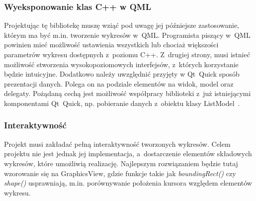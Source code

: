 \documentclass[11pt,twoside,a4paper,final]{article}
\begin{document}
\subsubsection{Wyeksponowanie klas C++ w QML}
Projektując tę bibliotekę muszę wziąć pod uwagę jej późniejsze zastosowanie, którym ma być m.in. tworzenie wykresów w~QML. Programista piszący w~QML powinien mieć możliwość ustawienia wszystkich lub chociaż większości parametrów wykresu dostępnych z~poziomu C++. Z~drugiej strony, musi istnieć możliwość stworzenia wysokopoziomowych interfejsów, z~których korzystanie będzie intuicyjne. Dodatkowo należy uwzględnić przyjęty w Qt~Quick sposób prezentacji danych. Polega on na podziale elementów na widok, model oraz delegaty. Pożądaną cechą jest możliwość współpracy biblioteki z~już istniejącymi komponentami Qt~Quick, np. pobieranie danych z~obiektu klasy ListModel~\cite{list-model}. 

\subsubsection{Interaktywność}
Projekt musi zakładać pełną interaktywność tworzonych wykresów. Celem projektu nie jest jednak jej implementacja, a~dostarczenie elementów składowych wykresów, które umożliwią realizację. Najlepszym rozwiązaniem będzie tutaj wzorowanie się na GraphicsView, gdzie funkcje takie jak \textit{boundingRect()} czy \textit{shape()} usprawniają, m.in. porównywanie położenia kursora względem elementów wykresu.

\end{document}
